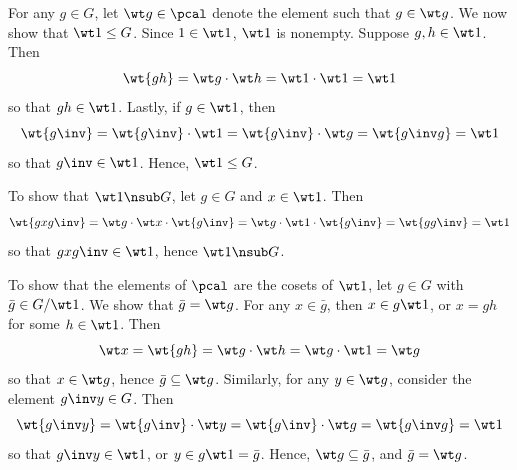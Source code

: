 \begin{sol}[spsol]
    For any $g \in G$, let $\wt g \in \pcal$ denote the element such that $g \in \wt g$.
	We now show that $\wt 1 \leq G$.
	Since $1 \in \wt 1$, $\wt 1$ is nonempty.
	Suppose $g, h \in \wt 1$.
	Then
    \[
    	\wt{gh} = \wt g \cdot \wt h = \wt 1 \cdot \wt 1 = \wt 1
    \]
    so that $gh \in \wt 1$.
	Lastly, if $g \in \wt 1$, then
    \[
    	\wt{g\inv} = \wt{g\inv} \cdot \wt 1 = \wt{g\inv} \cdot \wt g = \wt{g\inv g} = \wt 1
    \]
    so that $g\inv \in \wt 1$.
	Hence, $\wt 1 \leq G$.

    To show that $\wt 1 \nsub G$, let $g \in G$ and $x \in \wt 1$.
	Then
    \[
    	\wt{gxg\inv} = \wt g \cdot \wt x \cdot \wt{g\inv} = \wt g \cdot \wt 1 \cdot \wt{g\inv} = \wt{gg\inv} = \wt 1
    \]
    so that $gxg\inv \in \wt 1$, hence $\wt 1 \nsub G$.

    To show that the elements of $\pcal$ are the cosets of $\wt 1$, let $g \in G$ with $\bar g \in G/\wt 1$.
	We show that $\bar g = \wt g$.
	For any $x \in \bar g$, then $x \in g\wt 1$, or $x = gh$ for some $h \in \wt 1$.
	Then
    \[
    	\wt x = \wt{gh} = \wt g \cdot \wt h = \wt g \cdot \wt 1 = \wt g
    \]
    so that $x \in \wt g$, hence $\bar g \subseteq \wt g$.
	Similarly, for any $y \in \wt g$, consider the element $g\inv y \in G$.
	Then
    \[
    	\wt{g\inv y} = \wt{g\inv} \cdot \wt y = \wt{g\inv} \cdot \wt g = \wt{g\inv g} = \wt 1
    \]
    so that $g\inv y \in \wt 1$, or $y \in g\wt 1 = \bar g$.
	Hence, $\wt g \subseteq \bar g$, and $\bar g = \wt g$.
\end{sol}